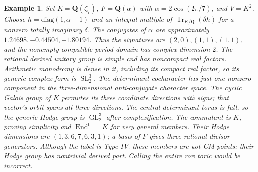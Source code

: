 \documentclass[11pt,reqno]{article}
\theoremstyle{emphasizedplain}
\theoremstyle{emphasizeddefinition}
\newtheorem{example}[theorem]{Example}
\theoremstyle{emphasizeddefinition}
\DeclareMathOperator{\End}{End}
\DeclareMathOperator{\GL}{GL}
\DeclareMathOperator{\SL}{SL}
\DeclareMathOperator{\Tr}{Tr}
\newcommand{\Q}{\mathbf Q}
\begin{document}
\begin{example}
Set $K=\Q(\zeta_7)$, $F=\Q(\alpha)$ with
$\alpha=2\cos(2\pi/7)$, and $V=K^2$. Choose
$h=\mathrm{diag}(1,\alpha-1)$ and an integral multiple of
$\Tr_{K/\Q}(\delta h)$ for a nonzero totally imaginary $\delta$.
The conjugates of $\alpha$ are approximately
$1.24698,-0.44504,-1.80194$. Thus the signatures are $(2,0),(1,1),(1,1)$,
and the nonempty compatible period domain has complex dimension $2$.
The rational derived unitary group is simple and has noncompact real
factors. Arithmetic monodromy is dense in it, including its compact real
factor, so its generic complex form is $\SL_2^3$.
The determinant cocharacter has just one nonzero component in the
three-dimensional anti-conjugate character space. The cyclic Galois group
of $K$ permutes its three coordinate directions with signs; that vector's
orbit spans all three directions. The central determinant torus is full,
so the generic Hodge group is $\GL_2^3$ after complexification.
The commutant is $K$, proving simplicity and $\End^0=K$ for very general
members. Their Hodge dimensions are $(1,3,6,7,6,3,1)$; a basis of $F$
gives three rational divisor generators. Although the label is Type IV,
these members are not CM points: their Hodge group has nontrivial derived
part. Calling the entire row toric would be incorrect.
\end{example}
\end{document}
